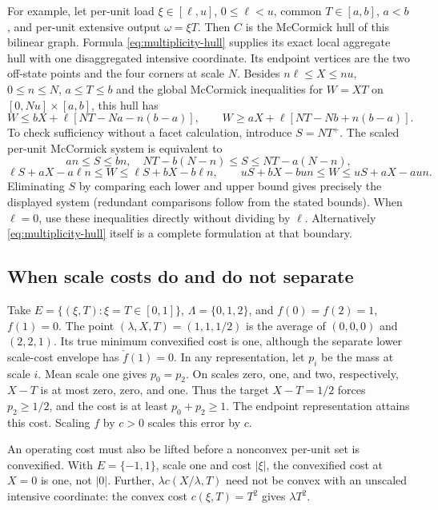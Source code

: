 For example, let per-unit load $\xi\in[\ell,u]$, $0\le\ell<u$, common
$T\in[a,b]$, $a<b$, and per-unit extensive output $\omega=\xi T$.
Then $C$ is the McCormick hull of this bilinear graph. Formula
\eqref{eq:multiplicity-hull} supplies its exact local aggregate hull with
one disaggregated intensive coordinate. Its endpoint vertices are the two
off-state points and the four corners at scale $N$. Besides
$n\ell\le X\le nu$, $0\le n\le N$, $a\le T\le b$ and the global
McCormick inequalities for $W=XT$ on $[0,Nu]\times[a,b]$, this hull has
\begin{equation}\label{eq:scale-bilinear-cuts}
 W\le bX+\ell[NT-Na-n(b-a)],\qquad
 W\ge aX+\ell[NT-Nb+n(b-a)].
\end{equation}
To check sufficiency without a facet calculation, introduce $S=NT^+$.
The scaled per-unit McCormick system is equivalent to
\[
 an\le S\le bn,\quad N T-b(N-n)\le S\le NT-a(N-n),
\]
\[
 \ell S+aX-a\ell n\le W\le\ell S+bX-b\ell n,
 \qquad uS+bX-bun\le W\le uS+aX-aun.
\]
Eliminating $S$ by comparing each lower and upper bound gives precisely
the displayed system (redundant comparisons follow from the stated
bounds). When $\ell=0$, use these inequalities directly without dividing
by $\ell$. Alternatively \eqref{eq:multiplicity-hull} itself is a complete
formulation at that boundary.

\subsection{When scale costs do and do not separate}
\begin{example}
\label{ex:scale-cost}
Take $E=\{(\xi,T):\xi=T\in[0,1]\}$, $\Lambda=\{0,1,2\}$, and
$f(0)=f(2)=1$, $f(1)=0$. The point $(\lambda,X,T)=(1,1,1/2)$ is the
average of $(0,0,0)$ and $(2,2,1)$. Its true minimum convexified cost
is one, although the separate lower scale-cost envelope has
$\check f(1)=0$. In any representation, let $p_i$ be the mass at scale $i$. Mean scale one
gives $p_0=p_2$. On scales zero, one, and two, respectively, $X-T$ is
at most zero, zero, and one. Thus the target $X-T=1/2$ forces
$p_2\ge1/2$, and the cost is at least $p_0+p_2\ge1$. The endpoint
representation attains this cost. Scaling $f$ by $c>0$ scales this error
by $c$.
\end{example}
An operating cost must also be lifted before a nonconvex per-unit set is
convexified. With $E=\{-1,1\}$, scale one and cost $|\xi|$, the
convexified cost at $X=0$ is one, not $|0|$. Further,
$\lambda c(X/\lambda,T)$ need not be convex with an unscaled intensive
coordinate: the convex cost $c(\xi,T)=T^2$ gives $\lambda T^2$.


